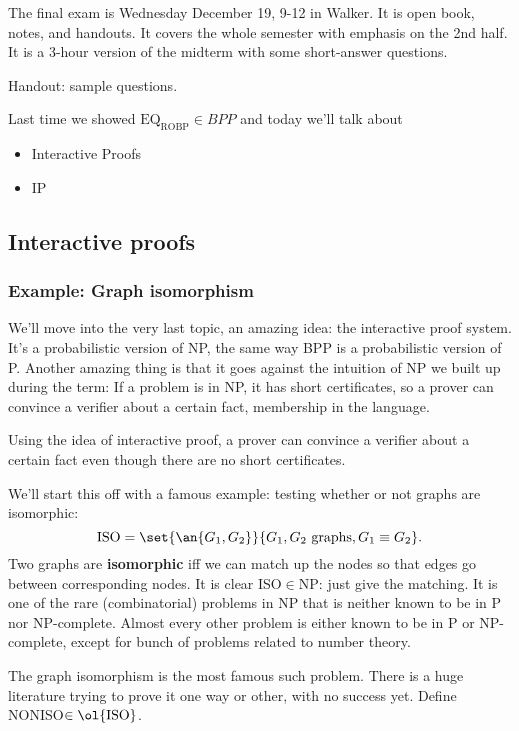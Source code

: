 
The final exam is Wednesday December 19, 9-12 in Walker. It is open book, notes, and handouts. It covers the whole semester with emphasis on the 2nd half. It is a 3-hour version of the midterm with some short-answer questions.

Handout: sample questions.

Last time we showed $\text{EQ}_{\text{ROBP}}\in BPP$ and today we'll talk about
\begin{itemize}
\item
Interactive Proofs
\item
IP
\end{itemize}


\subsection{Interactive proofs}

\subsubsection{Example: Graph isomorphism}

We'll move into the very last topic, an amazing idea: the interactive proof system. %
It's a probabilistic version of NP, the same way BPP is a probabilistic version of P. Another amazing thing is that it goes against the intuition of NP we built up during the term: If a problem is in NP, it has short certificates, so a prover can convince a verifier about a certain fact, membership in the language.

Using the idea of interactive proof, a prover can convince a verifier about a certain fact even though there are no short certificates. 

We'll start this off with a famous example: testing whether or not graphs are isomorphic:
\[
\text{ISO}=\set{\an{G_1,G_2}}{G_1,G_2\text{ graphs},G_1\equiv G_2}.
\]
Two graphs are \textbf{isomorphic} iff we can match up the nodes so that edges go between corresponding nodes.
It is clear ISO$\in$NP: just give the matching.
It is one of the rare (combinatorial) problems in NP that is neither known to be in P nor NP-complete. Almost every other problem is either known to be in P or NP-complete, except for bunch of problems related to number theory.

The graph isomorphism is the most famous such problem. There is a huge literature trying to prove it one way or other, with no success yet.
Define NONISO$\in\ol{\text{ISO}}$.

